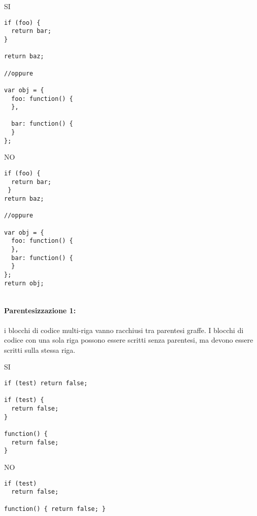 \documentclass[../ProcessiPrimari.tex]{subfiles}
\begin{document}
\begin{center}{
\begin{minipage}{6cm}
	{\begin{center}SI\end{center}}
	\begin{Verbatim}[frame=single]
if (foo) {
  return bar;
}

return baz;
	
//oppure 
	
var obj = {
  foo: function() {
  },
	
  bar: function() {
  }
};
\end{Verbatim}
\end{minipage}
\hfil
\begin{minipage}{6cm}
	{\begin{center}NO\end{center}}
	\begin{Verbatim}[frame=single]
if (foo) {
  return bar;
 }
return baz;
	
//oppure
	
var obj = {
  foo: function() {
  },
  bar: function() {
  }
};
return obj;
	
	\end{Verbatim}
\end{minipage}
}
\end{center}
\paragraph{Parentesizzazione 1:}i blocchi di codice multi-riga vanno racchiusi tra parentesi graffe.
I blocchi di codice con una sola riga possono essere scritti senza parentesi, ma devono essere scritti sulla stessa riga.\\
\begin{center}{
\begin{minipage}{6.5cm}
{\begin{center}SI\end{center}}
\begin{Verbatim}[frame=single]
if (test) return false;

if (test) {
  return false;
}

function() {
  return false;
}
\end{Verbatim}
\end{minipage}
\hfil
\begin{minipage}{6.5cm}
	{\begin{center}NO\end{center}}
	\begin{Verbatim}[frame=single]
if (test)
  return false;
  
function() { return false; }




  
	\end{Verbatim}
\end{minipage}
}
\end{center}
\end{document}
